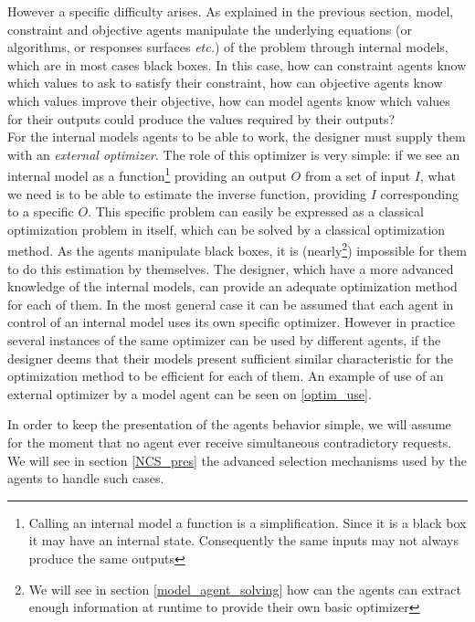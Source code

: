 However a specific difficulty arises. As explained in the previous section, model, constraint and objective agents manipulate the underlying equations (or algorithms, or responses surfaces \emph{etc.}) of the problem through internal models, which are in most cases black boxes. In this case, how can constraint agents know which values to ask to satisfy their constraint, how can objective agents know which values improve their objective, how can model agents know which values for their outputs could produce the values required by their outputs?\\
For the internal models agents to be able to work, the designer must supply them with an \emph{external optimizer}. The role of this optimizer is very simple: if we see an internal model as a function\footnote{Calling an internal model a function is a simplification. Since it is a black box it may have an internal state. Consequently the same inputs may not always produce the same outputs} providing an output $O$ from a set of input $I$, what we need is to be able to estimate the inverse function, providing $I$ corresponding to a specific $O$. This specific problem can easily be expressed as a classical optimization problem in itself, which can be solved by a classical optimization method. As the agents manipulate black boxes, it is (nearly\footnote{We will see in section \ref{model_agent_solving} how can the agents can extract enough information at runtime to provide their own basic optimizer}) impossible for them to do this estimation by themselves. The designer, which have a more advanced knowledge of the internal models, can provide an adequate optimization method for each of them. In the most general case it can be assumed that each agent in control of an internal model uses its own specific optimizer. However in practice several instances of the same optimizer can be used by different agents, if the designer deems that their models present sufficient similar characteristic for the optimization method to be efficient for each of them. An example of use of an external optimizer by a model agent can be seen on \figurename{} \ref{optim_use}.

In order to keep the presentation of the agents behavior simple, we will assume for the moment that no agent ever receive simultaneous contradictory requests. We will see in section \ref{NCS_pres} the advanced selection mechanisms used by the agents to handle such cases.

